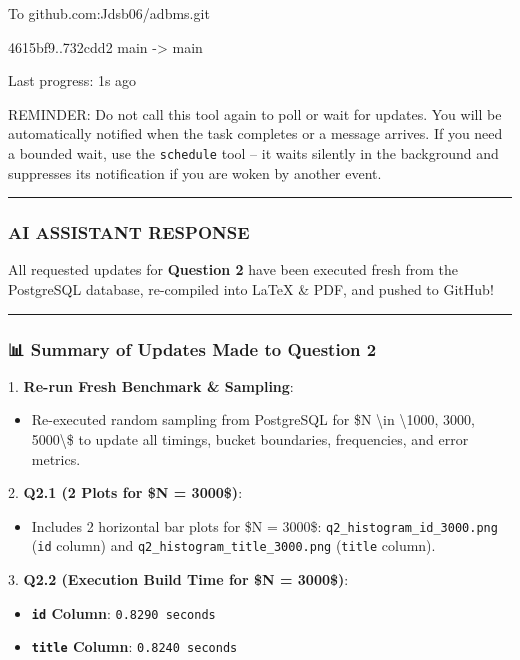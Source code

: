 \documentclass[11pt,a4paper]{article}
\begin{document}
To github.com:Jdsb06/adbms.git

4615bf9..732cdd2  main -> main


Last progress: 1s ago



REMINDER: Do not call this tool again to poll or wait for updates. You will be automatically notified when the task completes or a message arrives. If you need a bounded wait, use the \texttt{schedule} tool -- it waits silently in the background and suppresses its notification if you are woken by another event.


\hrule

\subsubsection{AI ASSISTANT RESPONSE}

All requested updates for \textbf{Question 2} have been executed fresh from the PostgreSQL database, re-compiled into LaTeX \& PDF, and pushed to GitHub!


\hrule


\subsubsection{📊 Summary of Updates Made to Question 2}

1. \textbf{Re-run Fresh Benchmark \& Sampling}:

\begin{itemize}
\item Re-executed random sampling from PostgreSQL for \$N \textbackslash{}in \textbackslash{}{1000, 3000, 5000\textbackslash{}}\$ to update all timings, bucket boundaries, frequencies, and error metrics.
\end{itemize}

2. \textbf{Q2.1 (2 Plots for \$N = 3000\$)}:

\begin{itemize}
\item Includes 2 horizontal bar plots for \$N = 3000\$: \texttt{q2\_histogram\_id\_3000.png} (\texttt{id} column) and \texttt{q2\_histogram\_title\_3000.png} (\texttt{title} column).
\end{itemize}

3. \textbf{Q2.2 (Execution Build Time for \$N = 3000\$)}:

\begin{itemize}
\item \textbf{\texttt{id} Column}: \texttt{0.8290 seconds}
\item \textbf{\texttt{title} Column}: \texttt{0.8240 seconds}
\end{itemize}
\end{document}
